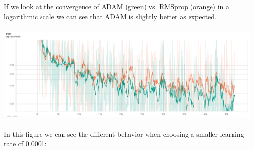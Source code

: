 \documentclass[10pt,a4paper]{article}
\begin{document}
If we look at the convergence of ADAM (green) vs. RMSprop (orange) in a logarithmic scale we can see that ADAM is slightly better as expected.
\begin{center}
    \includegraphics[width=15cm, height=5cm]{train_lr=0.001_bs=100.png}
\end{center}
In this figure we can see the different behavior when choosing a smaller learning rate of 0.0001:
\end{document}

